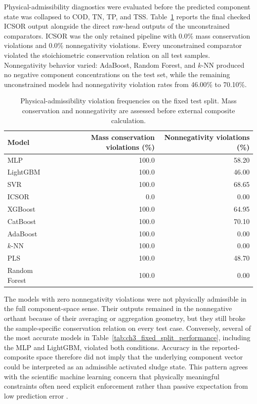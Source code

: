 \documentclass[12pt, twoside]{book}
\begin{document}
Physical-admissibility diagnostics were evaluated before the predicted component state was collapsed to COD,
TN, TP, and TSS. Table~\ref{tab:ch3_physical_violations} reports the final checked ICSOR output alongside the
direct raw-head outputs of the unconstrained comparators. ICSOR was the only retained pipeline with 0.0\% mass
conservation violations and 0.0\% nonnegativity violations. Every unconstrained comparator violated the
stoichiometric conservation relation on all test samples. Nonnegativity behavior varied: AdaBoost, Random
Forest, and \(k\)-NN produced no negative component concentrations on the test set, while the remaining
unconstrained models had nonnegativity violation rates from 46.00\% to 70.10\%.

\begin{table}[htbp]
\centering
\caption[Physical-admissibility violations in Chapter 3]{Physical-admissibility violation frequencies on the fixed test split. Mass conservation and nonnegativity are assessed before external composite calculation.}
\label{tab:ch3_physical_violations}
\scriptsize
\setlength{\tabcolsep}{5pt}
\begin{tabular}{lrr}
\toprule
Model & Mass conservation violations (\%) & Nonnegativity violations (\%) \\
\midrule
MLP & 100.0 & 58.20 \\
LightGBM & 100.0 & 46.00 \\
SVR & 100.0 & 68.65 \\
ICSOR & 0.0 & 0.00 \\
XGBoost & 100.0 & 64.95 \\
CatBoost & 100.0 & 70.10 \\
AdaBoost & 100.0 & 0.00 \\
\(k\)-NN & 100.0 & 0.00 \\
PLS & 100.0 & 48.70 \\
Random Forest & 100.0 & 0.00 \\
\bottomrule
\end{tabular}
\end{table}

The models with zero nonnegativity violations were not physically admissible in the full component-space
sense. Their outputs remained in the nonnegative orthant because of their averaging or aggregation geometry,
but they still broke the sample-specific conservation relation on every test case. Conversely, several of the
most accurate models in Table~\ref{tab:ch3_fixed_split_performance}, including the MLP and LightGBM, violated
both conditions. Accuracy in the reported-composite space therefore did not imply that the underlying
component vector could be interpreted as an admissible activated sludge state. This pattern agrees with the
scientific machine learning concern that physically meaningful constraints often need explicit enforcement
rather than passive expectation from low prediction error \citep{Hansen2024,KircherVotsmeier2025,SturmSilva2024}.
\end{document}

